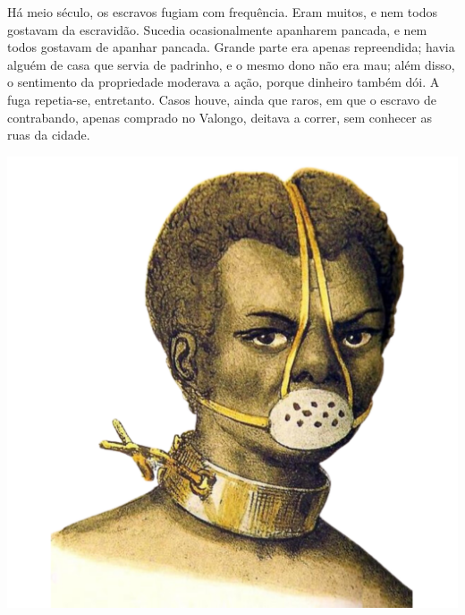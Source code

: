\begin{myquote}

\begin{minipage}{0.5\textwidth}
Há meio século, os escravos fugiam com frequência. Eram muitos, e nem todos
gostavam da escravidão. Sucedia ocasionalmente apanharem pancada, e nem todos
gostavam de apanhar pancada. Grande parte era apenas repreendida; havia alguém de
casa que servia de padrinho, e o mesmo dono não era mau; além disso, o sentimento da
propriedade moderava a ação, porque dinheiro também dói. A fuga repetia-se,
entretanto. Casos houve, ainda que raros, em que o escravo de contrabando, apenas
comprado no Valongo, deitava a correr, sem conhecer as ruas da cidade.
\end{minipage}
\hfill
\begin{minipage}{0.6\textwidth}
  \centering
  \includegraphics[width=\textwidth]{./imgSAEB_7_POR/media/image44.png}
\end{minipage}



\end{myquote}

